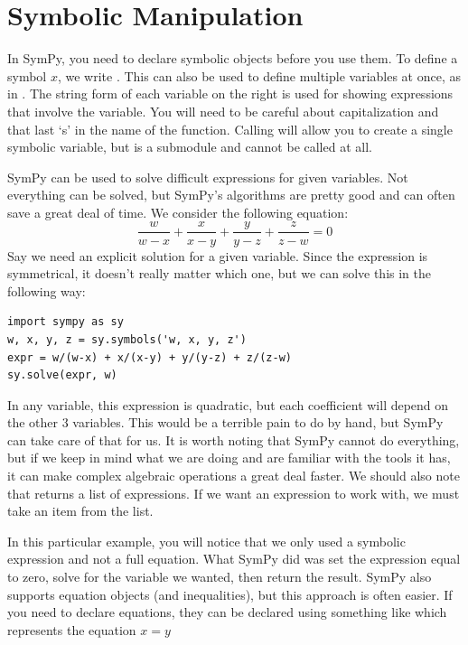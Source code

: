 \section*{Symbolic Manipulation}
In SymPy, you need to declare symbolic objects before you use them.
To define a symbol $x$, we write .
This can also be used to define multiple variables at once, as in .
The string form of each variable on the right is used for showing expressions that involve the variable.
You will need to be careful about capitalization and that last `s' in the name of the function.
Calling  will allow you to create a single symbolic variable, but  is a submodule and cannot be called at all.

SymPy can be used to solve difficult expressions for given variables.
Not everything can be solved, but SymPy's algorithms are pretty good and can often save a great deal of time.
We consider the following equation:
\begin{equation*}
\frac{w}{w-x}+\frac{x}{x-y}+\frac{y}{y-z}+\frac{z}{z-w}=0
\end{equation*}
Say we need an explicit solution for a given variable. 
Since the expression is symmetrical, it doesn't really matter which one, but we can solve this in the following way:
\begin{lstlisting}
import sympy as sy
w, x, y, z = sy.symbols('w, x, y, z')
expr = w/(w-x) + x/(x-y) + y/(y-z) + z/(z-w)
sy.solve(expr, w)
\end{lstlisting}
In any variable, this expression is quadratic, but each coefficient will depend on the other 3 variables.
This would be a terrible pain to do by hand, but SymPy can take care of that for us.
It is worth noting that SymPy cannot do everything, but if we keep in mind what we are doing and are familiar with the tools it has, it can make complex algebraic operations a great deal faster. 
We should also note that  returns a list of expressions.
If we want an expression to work with, we must take an item from the list.

In this particular example, you will notice that we only used a symbolic expression and not a full equation.
What SymPy did was set the expression equal to zero, solve for the variable we wanted, then return the result.
SymPy also supports equation objects (and inequalities), but this approach is often easier.
If you need to declare equations, they can be declared using something like  which represents the equation $x=y$


